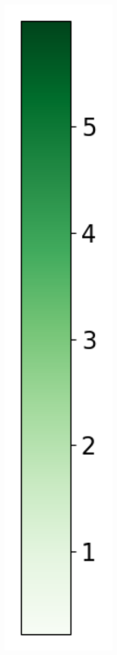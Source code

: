 \begin{figure}
\begin{subfigure}[b]{0.075\textwidth}
        \includegraphics[width=1\textwidth]{Results/kd-laplace/kd-Laplace/skewed-dataset/heatmap_legend_distance.png}
    \end{subfigure}
\end{figure}
